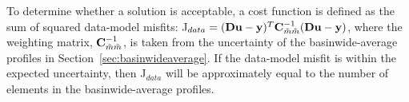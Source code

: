 \documentclass[12pt]{article}
\begin{document}


To determine whether a solution is acceptable, a cost function is defined as the
sum of squared data-model misfits: J$_{data} = ({\bf Du} - {\bf y})^T {\bf C}^{-1}_{{\tilde m}{\tilde m}} ({\bf Du} - {\bf y})$, where the weighting matrix, ${\bf C}^{-1}_{{\tilde m}{\tilde m}}$, is taken from the uncertainty of the basinwide-average profiles in Section~\ref{sec:basinwideaverage}. 
If the data-model misfit is within the expected uncertainty, then
J$_{data}$ will be approximately equal to the number of
elements in the basinwide-average profiles.
\end{document}
